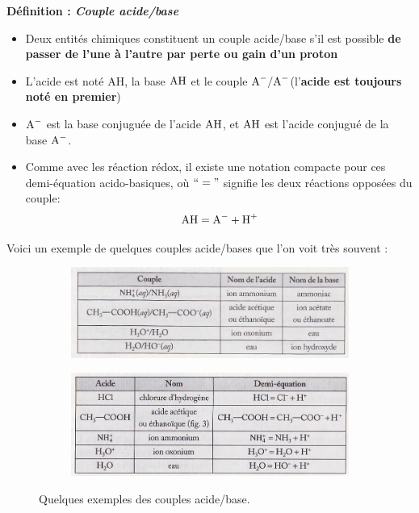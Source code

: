 \documentclass[11pt,a4paper]{article}
\newenvironment{defn}[1]
 {\begin{leftbar}\noindent \textbf{Définition :\textit{ \quad #1}} } { \end{leftbar}}
\begin{document}
\begin{defn}{Couple acide/base}
\begin{itemize}
    \item Deux entités chimiques constituent un couple acide/base s’il est possible \textbf{de passer de l’une à l’autre par perte ou gain d’un proton}
    \item L’acide est noté AH, la base $\ce{AH}$  et le couple $\ce{A-} / \ce{A-}$(l’\textbf{acide est toujours noté en premier})
    \item $\ce{A-}$ est la base conjuguée de l’acide $\ce{AH}$, et $\ce{AH}$ est l’acide conjugué de la base $\ce{A-}$.
    \item Comme avec les réaction rédox, il existe une notation compacte pour ces demi-équation acido-basiques, où $`` = "$ signifie les deux réactions opposées du couple: 
    $$\ce{AH} = \ce{A-} + \ce{H+} $$ 
\end{itemize}
\end{defn}

Voici un exemple de quelques couples acide/bases que l'on voit très souvent : 

\begin{figure}[ht]
\centering
\begin{subfigure}{.53\textwidth}
  \centering
  \includegraphics[width=\linewidth]{imgs/c3/tableAB.jpg}  
\end{subfigure}
\begin{subfigure}{.46\textwidth}
  \centering
  \includegraphics[width=\linewidth]{imgs/c3/tableACIDES.jpg}  
\end{subfigure}
\caption{Quelques exemples des couples acide/base.}
\end{figure}
\end{document}
